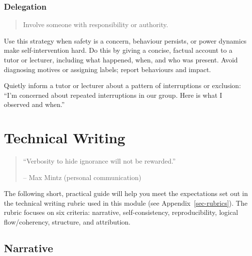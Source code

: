 \documentclass[
  a4paper,
  DIV=11,
  numbers=noendperiod,
  oneside]{scrreprt}
\begin{document}
\subsection{Delegation}\label{delegation}

\begin{quote}
Involve someone with responsibility or authority.
\end{quote}

Use this strategy when safety is a concern, behaviour persists, or power
dynamics make self-intervention hard. Do this by giving a concise,
factual account to a tutor or lecturer, including what happened, when,
and who was present. Avoid diagnosing motives or assigning labels;
report behaviours and impact.

\begin{tcolorbox}[enhanced jigsaw, colframe=quarto-callout-note-color-frame, title=\textcolor{quarto-callout-note-color}{\faInfo}\hspace{0.5em}{Example phrases}, breakable, opacityback=0, titlerule=0mm, colbacktitle=quarto-callout-note-color!10!white, toptitle=1mm, colback=white, coltitle=black, toprule=.15mm, bottomtitle=1mm, left=2mm, arc=.35mm, rightrule=.15mm, bottomrule=.15mm, opacitybacktitle=0.6, leftrule=.75mm]

Quietly inform a tutor or lecturer about a pattern of interruptions or
exclusion: ``I'm concerned about repeated interruptions in our group.
Here is what I observed and when.''

\end{tcolorbox}

\chapter{Technical Writing}\label{sec-technical-writing}

\begin{quote}
``Verbosity to hide ignorance will not be rewarded.''

-- Max Mintz (personal communication)
\end{quote}

The following short, practical guide will help you meet the expectations
set out in the technical writing rubric used in this module (see
Appendix~\ref{sec-rubrics}). The rubric focuses on six criteria:
narrative, self-consistency, reproducibility, logical flow/coherency,
structure, and attribution.

\section{Narrative}\label{sec-writing-narrative}
\end{document}
